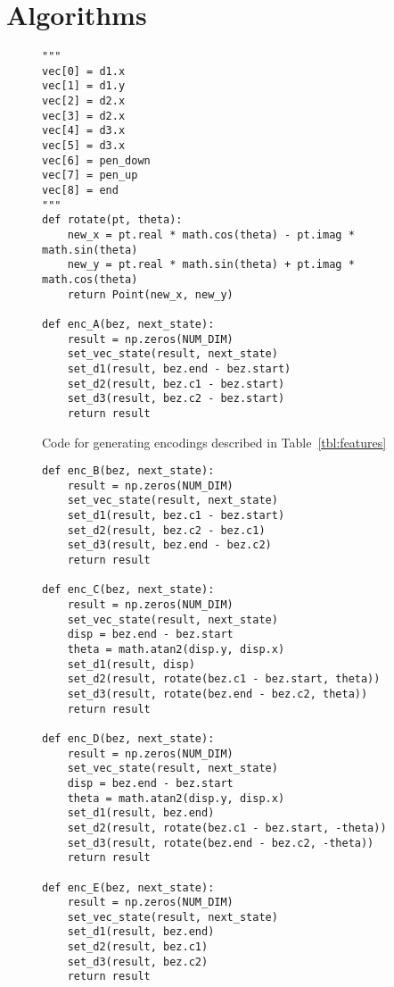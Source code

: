 \chapter{Algorithms}\label{app:convert-arc}

\begin{figure}[h]
    \caption{Code for generating encodings described in Table~\ref{tbl:features}\label{appfig:features-code}}
\begin{verbatim}
"""
vec[0] = d1.x
vec[1] = d1.y
vec[2] = d2.x
vec[3] = d2.x
vec[4] = d3.x
vec[5] = d3.x
vec[6] = pen_down
vec[7] = pen_up
vec[8] = end
"""
def rotate(pt, theta):
    new_x = pt.real * math.cos(theta) - pt.imag * math.sin(theta)
    new_y = pt.real * math.sin(theta) + pt.imag * math.cos(theta)
    return Point(new_x, new_y)

def enc_A(bez, next_state):
    result = np.zeros(NUM_DIM)
    set_vec_state(result, next_state)
    set_d1(result, bez.end - bez.start)
    set_d2(result, bez.c1 - bez.start)
    set_d3(result, bez.c2 - bez.start)
    return result
\end{verbatim}
\end{figure}

\begin{figure}[h]
\begin{verbatim}
def enc_B(bez, next_state):
    result = np.zeros(NUM_DIM)
    set_vec_state(result, next_state)
    set_d1(result, bez.c1 - bez.start)
    set_d2(result, bez.c2 - bez.c1)
    set_d3(result, bez.end - bez.c2)
    return result

def enc_C(bez, next_state):
    result = np.zeros(NUM_DIM)
    set_vec_state(result, next_state)
    disp = bez.end - bez.start
    theta = math.atan2(disp.y, disp.x)
    set_d1(result, disp)
    set_d2(result, rotate(bez.c1 - bez.start, theta))
    set_d3(result, rotate(bez.end - bez.c2, theta))
    return result

def enc_D(bez, next_state):
    result = np.zeros(NUM_DIM)
    set_vec_state(result, next_state)
    disp = bez.end - bez.start
    theta = math.atan2(disp.y, disp.x)
    set_d1(result, bez.end)
    set_d2(result, rotate(bez.c1 - bez.start, -theta))
    set_d3(result, rotate(bez.end - bez.c2, -theta))
    return result

def enc_E(bez, next_state):
    result = np.zeros(NUM_DIM)
    set_vec_state(result, next_state)
    set_d1(result, bez.end)
    set_d2(result, bez.c1)
    set_d3(result, bez.c2)
    return result
\end{verbatim}
\end{figure}

